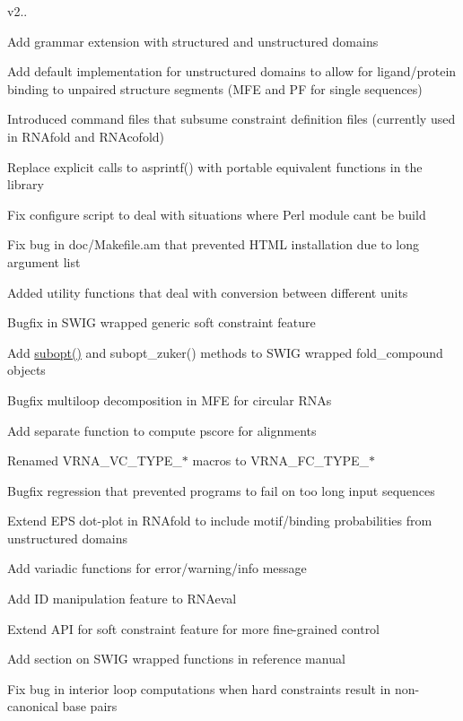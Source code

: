 v2..
\begin{DoxyItemize}
\item Add grammar extension with structured and unstructured domains
\item Add default implementation for unstructured domains to allow for ligand/protein binding to unpaired structure segments (M\+FE and PF for single sequences)
\item Introduced command files that subsume constraint definition files (currently used in R\+N\+Afold and R\+N\+Acofold)
\item Replace explicit calls to asprintf() with portable equivalent functions in the library
\item Fix configure script to deal with situations where Perl module can\textquotesingle{}t be build
\item Fix bug in doc/\+Makefile.\+am that prevented H\+T\+ML installation due to long argument list
\item Added utility functions that deal with conversion between different units
\item Bugfix in S\+W\+IG wrapped generic soft constraint feature
\item Add \hyperlink{group__subopt__wuchty_ga700f662506a233e42dd7fda74fafd40e}{subopt()} and subopt\+\_\+zuker() methods to S\+W\+IG wrapped fold\+\_\+compound objects
\item Bugfix multiloop decomposition in M\+FE for circular R\+N\+As
\item Add separate function to compute pscore for alignments
\item Renamed V\+R\+N\+A\+\_\+\+V\+C\+\_\+\+T\+Y\+P\+E\+\_\+$\ast$ macros to V\+R\+N\+A\+\_\+\+F\+C\+\_\+\+T\+Y\+P\+E\+\_\+$\ast$
\item Bugfix regression that prevented programs to fail on too long input sequences
\item Extend E\+PS dot-\/plot in R\+N\+Afold to include motif/binding probabilities from unstructured domains
\item Add variadic functions for error/warning/info message
\item Add ID manipulation feature to R\+N\+Aeval
\item Extend A\+PI for soft constraint feature for more fine-\/grained control
\item Add section on S\+W\+IG wrapped functions in reference manual
\item Fix bug in interior loop computations when hard constraints result in non-\/canonical base pairs
\end{DoxyItemize}

